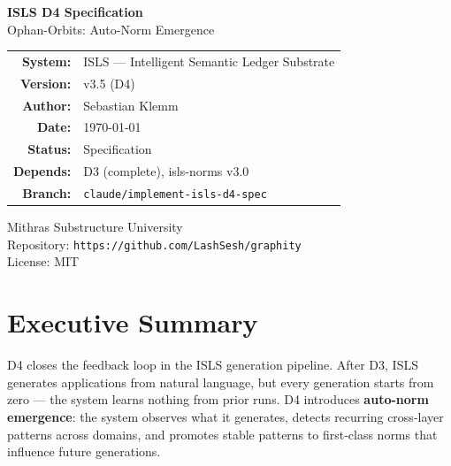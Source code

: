 \documentclass[11pt,a4paper]{article}
\begin{document}
\begin{titlepage}
\centering
\vspace*{3cm}

{\Huge\bfseries\color{isls-blue} ISLS D4 Specification}\\[0.5cm]
{\LARGE\color{isls-orange} Ophan-Orbits: Auto-Norm Emergence}\\[2cm]

{\large
\begin{tabular}{rl}
\textbf{System:}    & ISLS --- Intelligent Semantic Ledger Substrate \\
\textbf{Version:}   & v3.5 (D4) \\
\textbf{Author:}    & Sebastian Klemm \\
\textbf{Date:}      & \today \\
\textbf{Status:}    & Specification \\
\textbf{Depends:}   & D3 (complete), isls-norms v3.0 \\
\textbf{Branch:}    & \texttt{claude/implement-isls-d4-spec} \\
\end{tabular}
}

\vfill

{\small\color{isls-gray}
Mithras Substructure University\\
Repository: \texttt{https://github.com/LashSesh/graphity}\\
License: MIT
}
\end{titlepage}

\tableofcontents
\newpage

\section{Executive Summary}

D4 closes the feedback loop in the ISLS generation pipeline. After D3, ISLS 
generates applications from natural language, but every generation starts from 
zero --- the system learns nothing from prior runs. D4 introduces 
\textbf{auto-norm emergence}: the system observes what it generates, detects 
recurring cross-layer patterns across domains, and promotes stable patterns to 
first-class norms that influence future generations.
\end{document}
